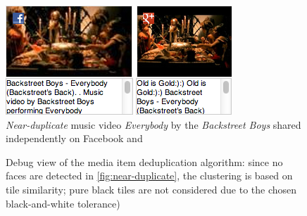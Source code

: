 \begin{figure}[!ht]
  \centering
  \includegraphics[width=0.9\linewidth]{./backstreetboys.png}
  \caption[\emph{Near-duplicate} music video \emph{Everybody} by the \emph{Backstreet Boys}]{\emph{Near-duplicate} music video \emph{Everybody} by the \emph{Backstreet Boys} shared independently on Facebook and \googleplus}
  \label{fig:near-duplicate}
\end{figure}

\begin{figure}[!ht]
  \centering
  \caption[Debug view of the media item deduplication algorithm]{Debug view of the media item deduplication algorithm:
  since no faces are detected in \autoref{fig:near-duplicate},
  the clustering is based on tile similarity;
  pure black tiles are not considered due to the chosen black-and-white tolerance)}
  \label{fig:algorithmdebugtilesimilarity}
\end{figure}

